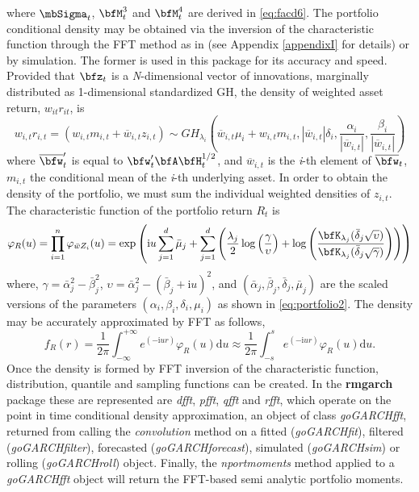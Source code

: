 where $\mbSigma_{t}$, $\bfM_{t}^3$ and $\bfM_{t}^4$ are derived in
\eqref{eq:facd6}. The portfolio conditional density may be obtained via
the inversion of the characteristic function through the FFT method as in
\cite{Chen2007} (see Appendix \ref{appendixI} for details) or by
simulation. The former is used in this package for its accuracy and speed.
Provided that $\bfz_t$ is a \emph{N}-dimensional vector of innovations,
marginally distributed as 1-dimensional standardized GH, the density of weighted
asset return, ${w_{it}}{r_{it}}$, is
\begin{equation}\label{eq:portfolio2}
{w_{i,t}}{r_{i,t}} = ({w_{i,t}}{m_{i,t}} + \overline{w}_{i,t}{z_{i,t}}) \sim
GH_{\lambda_i}\left(\overline{w}_{i,t}\mu_{i}+
{w_{i,t}}m_{i,t},\left|\overline{w}_{i,t}\right|\delta_{i},\frac{\alpha_{i}}{\left|
\overline{w}_{i,t} \right|},\frac{\beta_{i}}{\left| \overline{w}_{i,t} \right|}\right)
\end{equation}
where $\overline{\bfw}_t'$ is equal to $\bfw_t' \bfA \bfH_t^{1/2}$,
and \(\overline{w}_{i,t} \) is the \emph{i}-th element of \( \overline{\bfw}_t\), $m_{i,t}$
the conditional mean of the \emph{i}-th underlying asset. In order to obtain the
density of the portfolio, we must sum the individual weighted densities of
$z_{i,t}$.  The characteristic function of the portfolio return $R_t$ is
\begin{equation}\label{eq:portfolio3}
\varphi_R(u) = \prod\limits_{i = 1}^n {{\varphi_{\bar w{Z_i}}}} (u)
=  \exp{
   \left(
   \text{i}u\sum\limits_{j = 1}^d \bar\mu_j +
   \sum\limits_{j = 1}^d
   \left(
   \frac{\lambda_j}{2}
   \log{\left(\frac{\gamma}{\upsilon}\right)}
   +
   \log \left(
   \frac{\bfK_{\lambda _j}(\bar\delta_j\sqrt{\upsilon})}{\bfK_{\lambda_j}( \bar\delta_j \sqrt{\gamma})}
   \right)
   \right)
   \right)
   }
\end{equation}
where, $\gamma  = \bar \alpha _j^2 - \bar \beta _j^2$, $\upsilon  = \bar \alpha _j^2 - {({{\bar \beta }_j} + {\text{i}}u)^2}$,
and $(\bar \alpha_j, \bar \beta_j, \bar \delta_j, \bar \mu_j)$ are the scaled
versions of the parameters $(\alpha_{i}, \beta_{i}, \delta_{i}, \mu_{i})$
as shown in \eqref{eq:portfolio2}. The density may be accurately
approximated by FFT as follows,
\begin{equation}\label{eq:portfolio4}
{f_R}(r) = \frac{1} {{2\pi }}\int_{ - \infty }^{ + \infty } {{e^{( - \text{i}u r)}}} \varphi_R
(u)\mathrm{d}u \approx \frac{1} {{2\pi }}\int_{ - s}^s {{e^{( - \text{i}u r)}}} \varphi_R
(u)\mathrm{d}u.
\end{equation}
Once the density is formed by FFT inversion of the characteristic function,
distribution, quantile and sampling functions can be created. In the
{\bf rmgarch} package these are represented are \emph{dfft}, \emph{pfft},
\emph{qfft} and \emph{rfft}, which operate on the point in time conditional
density approximation, an object of class \emph{goGARCHfft}, returned from
calling the \emph{convolution} method on a fitted (\emph{goGARCHfit}), filtered
(\emph{goGARCHfilter}), forecasted (\emph{goGARCHforecast}), simulated
(\emph{goGARCHsim}) or rolling (\emph{goGARCHroll}) object. Finally, the
\emph{nportmoments} method applied to a \emph{goGARCHfft} object will return
the FFT-based semi analytic portfolio moments.
